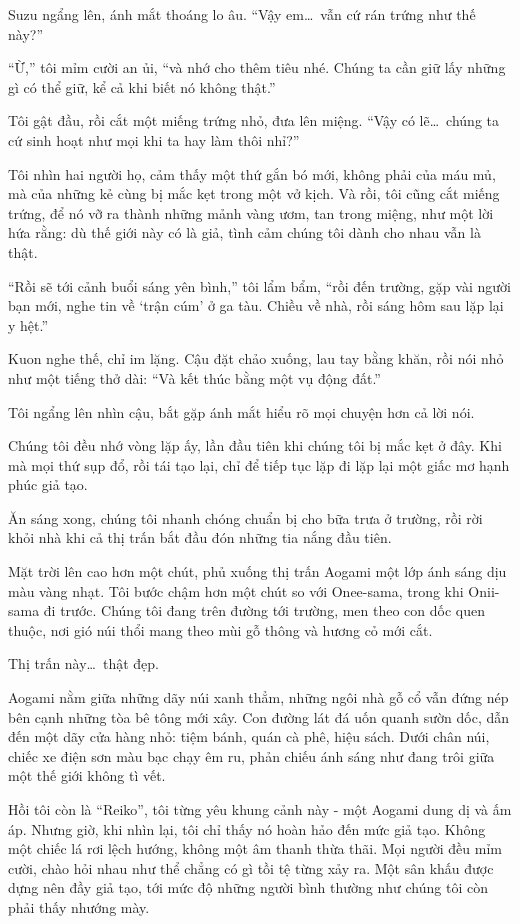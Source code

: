 \documentclass[../main.tex]{subfiles}
\begin{document}
Suzu ngẩng lên, ánh mắt thoáng lo âu. ``Vậy em\dots\ vẫn cứ rán trứng như thế này?''

``Ừ,'' tôi mỉm cười an ủi, ``và nhớ cho thêm tiêu nhé. Chúng ta cần giữ lấy những gì có thể giữ, kể cả khi biết nó không thật.''

Tôi gật đầu, rồi cắt một miếng trứng nhỏ, đưa lên miệng. ``Vậy có lẽ\dots\ chúng ta cứ sinh hoạt như mọi khi ta hay làm thôi nhỉ?''

Tôi nhìn hai người họ, cảm thấy một thứ gắn bó mới, không phải của máu mủ, mà của những kẻ cùng bị mắc kẹt trong một vở kịch. Và rồi, tôi cũng cắt miếng trứng, để nó vỡ ra thành những mảnh vàng ươm, tan trong miệng, như một lời hứa rằng: dù thế giới này có là giả, tình cảm chúng tôi dành cho nhau vẫn là thật.

``Rồi sẽ tới cảnh buổi sáng yên bình,'' tôi lẩm bẩm, ``rồi đến trường, gặp vài người bạn mới, nghe tin về `trận cúm' ở ga tàu. Chiều về nhà, rồi sáng hôm sau lặp lại y hệt.''

Kuon nghe thế, chỉ im lặng. Cậu đặt chảo xuống, lau tay bằng khăn, rồi nói nhỏ như một tiếng thở dài: ``Và kết thúc bằng một vụ động đất.''

Tôi ngẩng lên nhìn cậu, bắt gặp ánh mắt hiểu rõ mọi chuyện hơn cả lời nói.

Chúng tôi đều nhớ vòng lặp ấy, lần đầu tiên khi chúng tôi bị mắc kẹt ở đây. Khi mà mọi thứ sụp đổ, rồi tái tạo lại, chỉ để tiếp tục lặp đi lặp lại một giấc mơ hạnh phúc giả tạo.


Ăn sáng xong, chúng tôi nhanh chóng chuẩn bị cho bữa trưa ở trường, rồi rời khỏi nhà khi cả thị trấn bắt đầu đón những tia nắng đầu tiên.

Mặt trời lên cao hơn một chút, phủ xuống thị trấn Aogami một lớp ánh sáng dịu màu vàng nhạt. Tôi bước chậm hơn một chút so với Onee-sama, trong khi Onii-sama đi trước. Chúng tôi đang trên đường tới trường, men theo con dốc quen thuộc, nơi gió núi thổi mang theo mùi gỗ thông và hương cỏ mới cắt.

Thị trấn này\dots\ thật đẹp.

Aogami nằm giữa những dãy núi xanh thẳm, những ngôi nhà gỗ cổ vẫn đứng nép bên cạnh những tòa bê tông mới xây. Con đường lát đá uốn quanh sườn dốc, dẫn đến một dãy cửa hàng nhỏ: tiệm bánh, quán cà phê, hiệu sách. Dưới chân núi, chiếc xe điện sơn màu bạc chạy êm ru, phản chiếu ánh sáng như đang trôi giữa một thế giới không tì vết.

Hồi tôi còn là ``Reiko'', tôi từng yêu khung cảnh này - một Aogami dung dị và ấm áp. Nhưng giờ, khi nhìn lại, tôi chỉ thấy nó hoàn hảo đến mức giả tạo. Không một chiếc lá rơi lệch hướng, không một âm thanh thừa thãi. Mọi người đều mỉm cười, chào hỏi nhau như thể chẳng có gì tồi tệ từng xảy ra. Một sân khấu được dựng nên đầy giả tạo, tới mức độ những người bình thường như chúng tôi còn phải thấy nhướng mày.
\end{document}
